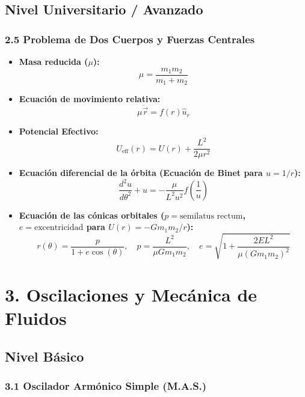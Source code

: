 \documentclass[11pt,a4paper]{article}
\begin{document}
\subsection*{Nivel Universitario / Avanzado}

\subsubsection*{2.5 Problema de Dos Cuerpos y Fuerzas Centrales}

\begin{itemize}
  \item \textbf{Masa reducida ($\mu$):}
  \[
    \mu = \frac{m_1 m_2}{m_1 + m_2}
  \]
  \item \textbf{Ecuación de movimiento relativa:}
  \[
    \mu \ddot{\vec{r}} = f(r) \hat{u}_r
  \]
  \item \textbf{Potencial Efectivo:}
  \[
    U_{\text{eff}}(r) = U(r) + \frac{L^2}{2\mu r^2}
  \]
  \item \textbf{Ecuación diferencial de la órbita (Ecuación de Binet para $u = 1/r$):}
  \[
    \frac{d^2 u}{d\theta^2} + u = -\frac{\mu}{L^2 u^2} f\left(\frac{1}{u}\right)
  \]
  \item \textbf{Ecuación de las cónicas orbitales ($p = \text{semilatus rectum}$, $e = \text{excentricidad}$ para $U(r) = -G m_1 m_2 / r$):}
  \[
    r(\theta) = \frac{p}{1 + e \cos(\theta)}, \quad p = \frac{L^2}{\mu G m_1 m_2}, \quad e = \sqrt{1 + \frac{2 E L^2}{\mu (G m_1 m_2)^2}}
  \]
\end{itemize}

\section*{3. Oscilaciones y Mecánica de Fluidos}

\subsection*{Nivel Básico}

\subsubsection*{3.1 Oscilador Armónico Simple (M.A.S.)}
\end{document}

